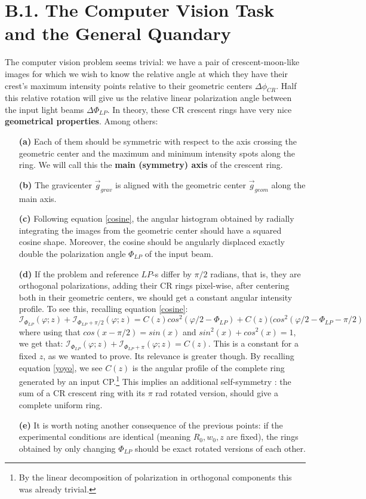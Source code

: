 \documentclass[11pt, a4paper, twoside]{article} %
\begin{document}
\section*{B.1. The Computer Vision Task and the General Quandary}
The computer vision problem seems trivial: we have a pair of crescent-moon-like images for which we wish to know the relative angle at which they have their crest's maximum intensity points relative to their geometric centers $\Delta \phi_{CR}$. Half this relative rotation will give us the relative linear polarization angle between the input light beams $\Delta \Phi_{LP}$. In theory, these CR crescent rings have very nice {\bf geometrical properties}. Among others:
\begin{itemize}
\item[\bf (a)] Each of them should be symmetric with respect to the axis crossing the geometric center and the maximum and minimum intensity spots along the ring. We will call this the {\bf main (symmetry) axis} of the crescent ring.
\item[\bf (b)] The gravicenter $\vec{g}_{grav}$ is aligned with the geometric center $\vec{g}_{geom}$ along the main axis.
\item[\bf (c)] Following equation \eqref{cosine}, the angular histogram obtained by radially integrating the images from the geometric center should have a squared cosine shape. Moreover, the cosine should be angularly displaced exactly double the polarization angle $\Phi_{LP}$ of the input beam.
\item[\bf (d)] If the problem and reference $LP$-s differ by $\pi/2$ radians, that is, they are orthogonal polarizations, adding their CR rings pixel-wise, after centering both in their geometric centers, we should get a constant angular intensity profile. To see this, recalling equation \eqref{cosine}:
\begin{equation}
\mathcal{I}_{\Phi_{LP}}(\varphi;z)+\mathcal{I}_{\Phi_{LP}+\pi/2}(\varphi;z) = C(z)cos^2(\varphi/2-\Phi_{LP})+C(z)(cos^2(\varphi/2-\Phi_{LP}-\pi/2)
\end{equation}
where using that $cos(x-\pi/2)=sin(x)$ and $sin^2(x)+cos^2(x)=1$, we get that: $\mathcal{I}_{\Phi_{LP}}(\varphi;z)+\mathcal{I}_{\Phi_{LP}+\pi}(\varphi;z) = C(z)$. This is a constant for a fixed $z$, as we wanted to prove. Its relevance is greater though. By recalling equation \eqref{yoyo}, we see $C(z)$ is the angular profile of the complete ring generated by an input CP.\footnote{By the linear decomposition of polarization in orthogonal components this was already trivial.} This implies an additional self-symmetry : the sum of a CR crescent ring with its $\pi$ rad rotated version, should give a complete uniform ring.
\item[\bf (e)] It is worth noting another consequence of the previous points: if the experimental conditions are identical (meaning $R_0,w_0,z$ are fixed), the rings obtained by only changing $\Phi_{LP}$ should be exact rotated versions of each other.
\end{itemize}
\end{document}
